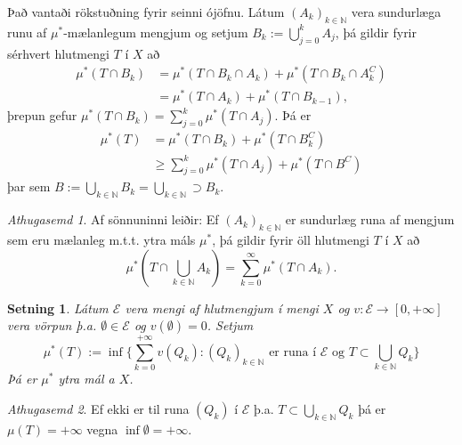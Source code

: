 \documentclass[a4paper,icelandic,11pt]{book}
\theoremstyle{plain}      \newtheorem{setn}{Setning}[chapter]
\theoremstyle{definition} \newtheorem{skilgr}[setn]{Skilgreining}
\theoremstyle{remark}     \newtheorem*{ath}{Athugasemd}
\newcommand{\N}{\mathbb N}
\begin{document}
Það vantaði rökstuðning fyrir seinni ójöfnu. Látum $(A_{k})_{k\in\N}$
vera sundurlæga runu af $\mu^{*}$-mælanlegum mengjum og setjum
$B_{k}:=\bigcup_{j=0}^{k}A_{j}$, þá gildir fyrir sérhvert hlutmengi
$T$ í $X$ að
\begin{align*}
  \mu^{*}(T\cap B_{k})
  &= \mu^{*}(T\cap B_{k}\cap A_{k})
  + \mu^{*}(T\cap B_{k}\cap{A_{k}^{C}})
  \\
  &=\mu^{*}(T\cap A_{k}) + \mu^{*}(T\cap B_{k-1}),
\end{align*}
þrepun gefur $\mu^{*}(T\cap
B_{k})=\sum_{j=0}^{k}\mu^{*}(T\cap{A_{j}})$. Þá er
\begin{align*}
  \mu^{*}(T)
  &= \mu^{*}(T\cap B_{k}) + \mu^{*}(T\cap B_{k}^{C})\\
  &\ge \sum_{j=0}^{k}\mu^{*}(T\cap A_{j}) + \mu^{*}(T\cap B^{C})
\end{align*}
þar sem $B:=\bigcup_{k\in\N}B_{k}=\bigcup_{k\in\N}\supset B_{k}$.
\begin{ath}
  Af sönnuninni leiðir: Ef $(A_{k})_{k\in\N}$ er sundurlæg runa af
  mengjum sem eru mælanleg m.t.t. ytra máls $\mu^{*}$, þá gildir fyrir
  öll hlutmengi $T$ í $X$ að
  \[
  \mu^{*}(T\cap\bigcup_{k\in\N}A_{k})
  = \sum_{k=0}^{\infty}\mu^{*}(T\cap A_{k}).
  \]
\end{ath}
\begin{setn}
  Látum $\mathcal E$ vera mengi af hlutmengjum í mengi $X$ og
  $v:\mathcal E\to\left[0,+\infty\right]$ vera vörpun
  þ.a. $\emptyset\in\mathcal E$ og $v(\emptyset) = 0$. Setjum
  \[
  \mu^{*}(T)
  := \inf
  \{
    \sum_{k=0}^{+\infty}v(Q_{k}) : (Q_{k})_{k\in\N}
    \text{ er runa í $\mathcal E$ og }T\subset\bigcup_{k\in\N}Q_{k}
  \}
  \]
  Þá er $\mu^{*}$ ytra mál a $X$.
\end{setn}
\begin{ath}
  Ef ekki er til runa $(Q_{k})$ í $\mathcal E$
  þ.a. $T\subset\bigcup_{k\in\N}Q_{k}$ þá er $\mu(T)=+\infty$ vegna
  $\inf\emptyset = +\infty$.
\end{ath}
\end{document}
